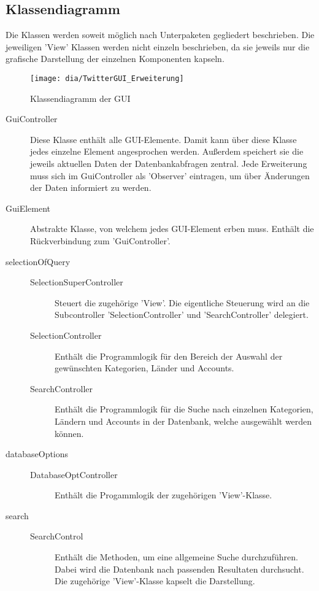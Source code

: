 \subsection{Klassendiagramm}
Die Klassen werden soweit möglich nach Unterpaketen gegliedert beschrieben. Die jeweiligen 'View' Klassen werden nicht einzeln beschrieben, da sie jeweils nur die grafische Darstellung der einzelnen Komponenten kapseln.

\begin{figure}[h!]
	\centering
	\texttt{[image: dia/TwitterGUI\_Erweiterung]}
	\caption{Klassendiagramm der GUI}
	\label{fig:GUI}
\end{figure}
\quad
\begin{description}
	
	\item[GuiController] Diese Klasse enthält alle GUI-Elemente. Damit kann über diese Klasse jedes einzelne Element angesprochen werden. Außerdem speichert sie die jeweils aktuellen Daten der Datenbankabfragen zentral. Jede Erweiterung muss sich im GuiController als 'Observer' eintragen, um über Änderungen der Daten informiert zu werden. 
	\item[GuiElement] Abstrakte Klasse, von welchem jedes GUI-Element erben muss. Enthält die Rückverbindung zum 'GuiController'.
	\item[selectionOfQuery]  
	\quad
		 \begin{description}  	
		\item[SelectionSuperController] Steuert die zugehörige 'View'. Die eigentliche Steuerung wird an die Subcontroller 'SelectionController' und 'SearchController' delegiert.
		\item[SelectionController] Enthält die Programmlogik für den Bereich der Auswahl der gewünschten Kategorien, Länder und Accounts.
		\item[SearchController] Enthält die Programmlogik für die Suche nach einzelnen Kategorien, Ländern und Accounts in der Datenbank, welche ausgewählt werden können. 
		
		\end{description}
	\item[databaseOptions] 	\quad
		\begin{description}
			\item[DatabaseOptController] Enthält die Progammlogik der zugehörigen 'View'-Klasse.
		\end{description}
	\item[search] \quad
		\begin{description}
			\item[SearchControl] Enthält die Methoden, um eine allgemeine Suche durchzuführen. Dabei wird die Datenbank nach passenden Resultaten durchsucht. Die zugehörige 'View'-Klasse kapselt die Darstellung.
		\end{description}
		

\end{description}
